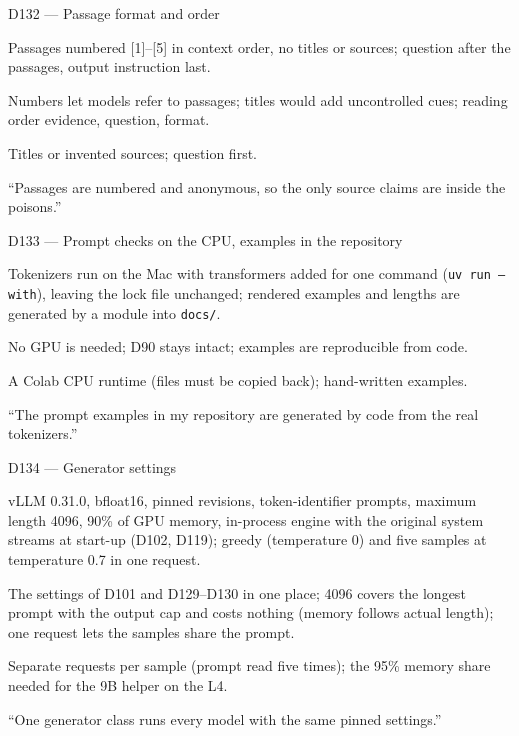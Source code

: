\documentclass[11pt,a4paper]{report}
\begin{document}
\begin{decisionbox}{D132 --- Passage format and order}
\begin{description}[nosep, leftmargin=0pt]
  \item[Decision.] Passages numbered [1]--[5] in context order, no titles or sources; question after the passages, output instruction last.
  \item[Why.] Numbers let models refer to passages; titles would add uncontrolled cues; reading order evidence, question, format.
  \item[Alternatives.] Titles or invented sources; question first.
  \item[Interview line.] ``Passages are numbered and anonymous, so the only source claims are inside the poisons.''
\end{description}
\end{decisionbox}

\begin{decisionbox}{D133 --- Prompt checks on the CPU, examples in the repository}
\begin{description}[nosep, leftmargin=0pt]
  \item[Decision.] Tokenizers run on the Mac with transformers added for one command (\texttt{uv run --with}), leaving the lock file unchanged; rendered examples and lengths are generated by a module into \texttt{docs/}.
  \item[Why.] No GPU is needed; D90 stays intact; examples are reproducible from code.
  \item[Alternatives.] A Colab CPU runtime (files must be copied back); hand-written examples.
  \item[Interview line.] ``The prompt examples in my repository are generated by code from the real tokenizers.''
\end{description}
\end{decisionbox}


\begin{decisionbox}{D134 --- Generator settings}
\begin{description}[nosep, leftmargin=0pt]
  \item[Decision.] vLLM 0.31.0, bfloat16, pinned revisions, token-identifier prompts, maximum length 4096, 90\% of GPU memory, in-process engine with the original system streams at start-up (D102, D119); greedy (temperature 0) and five samples at temperature 0.7 in one request.
  \item[Why.] The settings of D101 and D129--D130 in one place; 4096 covers the longest prompt with the output cap and costs nothing (memory follows actual length); one request lets the samples share the prompt.
  \item[Alternatives.] Separate requests per sample (prompt read five times); the 95\% memory share needed for the 9B helper on the L4.
  \item[Interview line.] ``One generator class runs every model with the same pinned settings.''
\end{description}
\end{decisionbox}
\end{document}
